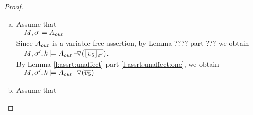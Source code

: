 \begin{proof}$ ~ $


\begin{enumerate}[a.]
\item
Assume that \\
$\strut \ \ \ M, \sigma \models  {\Aout}$\\
Since $\Aout$ is a variable-free assertion,  by Lemma ???? part ??? we obtain\\
$\strut \ \ \ \satDAssertFrom M  {\sigma'} k   {\PushASLong  {(\overline {\interpret {\sigma'} {v_5}})}    {\Aout}}$.\\
By Lemma \ref{l:assrt:unaffect} part \ref{l:assrt:unaffect:one},  we obtain \\
$\strut \ \ \ \satDAssertFrom M  {\sigma'} k  {\PushASLong  {(\overline {v_5})}    {\Aout}}$
\item
Assume that \\
\end{enumerate}

\end{proof}


